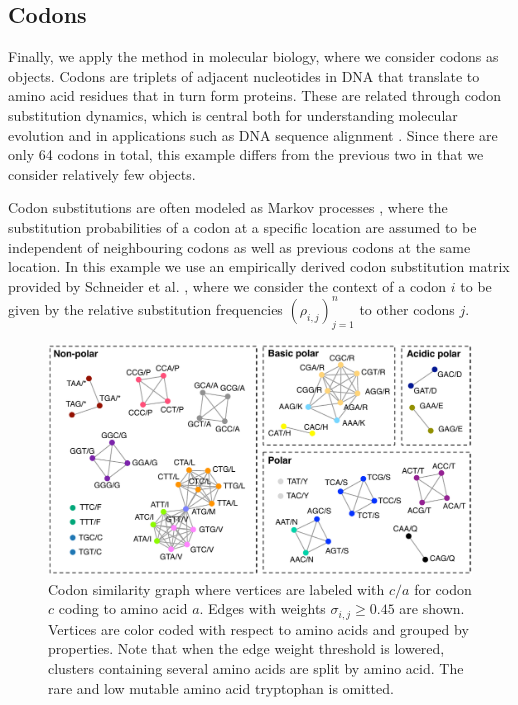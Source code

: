 \documentclass[conference]{IEEEtran}
\newcommand{\rn}[1]{\rho_{#1}}
\newcommand{\sy}[1]{\sigma_{#1}}
\begin{document}
\subsection{Codons}

Finally, we apply the method in molecular biology, where we consider codons as objects. Codons are triplets of
adjacent nucleotides in DNA that translate to amino acid residues that in turn form proteins.  These are related
through codon substitution dynamics, which is central both for understanding molecular evolution and in applications
such as DNA sequence alignment \cite{Anisimova09}. Since there are only 64 codons in total, this example differs from
the previous two in that we consider relatively few objects.

Codon substitutions are often modeled as Markov processes \cite{Anisimova09}, where the
substitution probabilities of a codon at a specific location are assumed to be independent of neighbouring codons as
well as previous codons at the same location. In this example we use an empirically derived codon substitution matrix 
provided by Schneider et al. \cite{Schneider2005}, where we consider the context of a codon $i$ to be given by the relative substitution frequencies
$(\rn{i,j})_{j=1}^n$ to other codons $j$.

\begin{figure}
\begin{centering}
\includegraphics[width=1.0\columnwidth]{figures/codon-example.pdf}
\end{centering}
\caption{Codon similarity graph where vertices are labeled with $c/a$ for codon $c$ coding to amino acid $a$. Edges
with weights $\sy{i,j} \geq 0.45$ are shown. Vertices are color coded with respect to amino acids and grouped by
properties. Note that when the edge weight threshold is lowered, clusters containing several amino acids are split by
amino acid. The rare and low mutable amino acid tryptophan is omitted. }
\label{fig:codons}
\end{figure}
\end{document}
